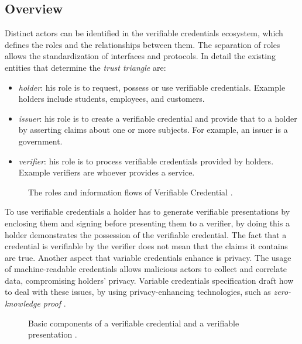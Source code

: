 \subsection*{Overview}

Distinct actors can be identified in the verifiable credentials ecosystem, which defines the roles and the relationships between them. The separation of roles allows the standardization of interfaces and protocols. In detail the existing entities that determine the \textit{trust triangle} \cite{trustOverIP} are: 

\begin{itemize}
    \item \textit{holder}: his role is to request, possess or use verifiable credentials. Example holders include students, employees, and customers.
    \item \textit{issuer}: his role is to create a verifiable credential and provide that to a holder by asserting claims about one or more subjects. For example, an issuer is a government. 
    \item \textit{verifier}: his role is to process verifiable credentials provided by holders. Example verifiers are whoever provides a service. 
\end{itemize}

\begin{figure}[h!]
    \centering
    
    \caption{The roles and information flows of Verifiable Credential \cite{vcW3C}.}
    \label{vcEcosystem}
\end{figure}

To use verifiable credentials a holder has to generate verifiable presentations by enclosing them and signing before presenting them to a verifier, by doing this a holder demonstrates the possession of the verifiable credential. The fact that a credential is verifiable by the verifier does not mean that the claims it contains are true. Another aspect that variable credentials enhance is privacy. The usage of machine-readable credentials allows malicious actors to collect and correlate data, compromising holders' privacy. Variable credentials specification draft how to deal with these issues, by using privacy-enhancing technologies, such as \textit{zero-knowledge proof} \cite{zkp-survey}. 

\begin{figure}[h!]
    \centering
     
    \hfil
    
    \caption{Basic components of a verifiable credential and a verifiable presentation \cite{vcW3C}.}
    \label{vc-vp-topview}
\end{figure}

